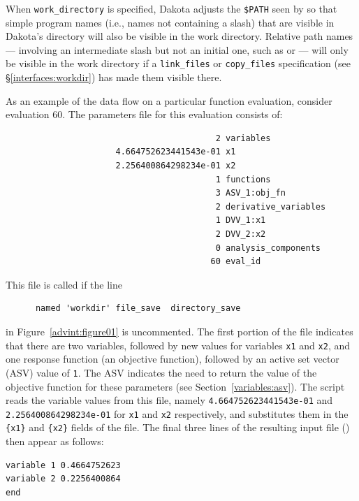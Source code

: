 When \texttt{work\_directory} is specified, Dakota adjusts the \texttt{\$PATH} seen
by  so that simple program names
(i.e., names not containing a slash) that
are visible in Dakota's directory will also be visible in the work directory.
Relative path names ---
involving an intermediate slash but not an initial one,
such as  or  ---
will only be visible in the work directory if a \texttt{link\_files}
or \texttt{copy\_files} specification (see \S\ref{interfaces:workdir})
has made them visible there.

As an example of the data flow on a particular function evaluation,
consider evaluation 60. The parameters file for this evaluation consists of:
\begin{small}
\begin{verbatim}
                                          2 variables
                      4.664752623441543e-01 x1
                      2.256400864298234e-01 x2
                                          1 functions
                                          3 ASV_1:obj_fn
                                          2 derivative_variables
                                          1 DVV_1:x1
                                          2 DVV_2:x2
                                          0 analysis_components
                                         60 eval_id
\end{verbatim}
\end{small}

This file is called  if the line
\begin{small}
\begin{verbatim}
 	  named 'workdir' file_save  directory_save
\end{verbatim}
\end{small}
in Figure~\ref{advint:figure01} is uncommented.
The first portion of the file indicates that there are two variables,
followed by new values for variables \texttt{x1} and \texttt{x2}, and
one response function (an objective function), followed by an active
set vector (ASV) value of \texttt{1}. The ASV indicates the need to
return the value of the objective function for these parameters (see
Section~\ref{variables:asv}). The  script reads the
variable values from this file, namely \texttt{4.664752623441543e-01}
and \texttt{2.256400864298234e-01} for \texttt{x1} and \texttt{x2}
respectively, and substitutes them in the \texttt{\{x1\}} and
\texttt{\{x2\}} fields of the  file. The final
three lines of the resulting input file () then appear
as follows:
\begin{small}
\begin{verbatim}
variable 1 0.4664752623
variable 2 0.2256400864
end
\end{verbatim}
\end{small}

